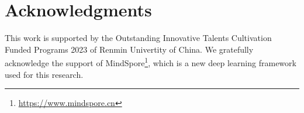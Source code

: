 \documentclass[letterpaper]{article} \usepackage{aaai23}  \usepackage{times}  \usepackage{helvet}  \usepackage{courier}  \usepackage[hyphens]{url}  \usepackage{graphicx} \urlstyle{rm} \def\UrlFont{\rm}  \usepackage{natbib}  \usepackage{caption} \frenchspacing  \setlength{\pdfpagewidth}{8.5in}  \setlength{\pdfpageheight}{11in}  \usepackage{algorithm}
\begin{document}
%
 

\section*{Acknowledgments}
This work is supported by the Outstanding Innovative Talents Cultivation Funded Programs 2023 of Renmin Univertity of China. We gratefully acknowledge the support of MindSpore\footnote{\url{https://www.mindspore.cn}}, which is a new deep learning framework used for this research.


\balance
\end{document}
